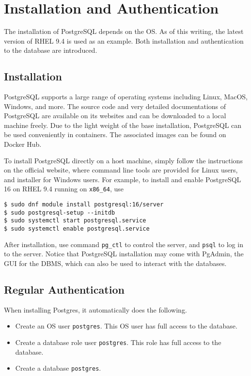 \section{Installation and Authentication}

The installation of PostgreSQL depends on the OS. As of this writing, the latest version of RHEL 9.4 is used as an example. Both installation and authentication to the database are introduced.

\subsection{Installation}

PostgreSQL supports a large range of operating systems including Linux, MacOS, Windows, and more. The source code and very detailed documentations of PostgreSQL are available on its websites and can be downloaded to a local machine freely. Due to the light weight of the base installation, PostgreSQL can be used conveniently in containers. The associated images can be found on Docker Hub.

To install PostgreSQL directly on a host machine, simply follow the instructions on the official website, where command line tools are provided for Linux users, and installer for Windows users. For example, to install and enable PostgreSQL 16 on RHEL 9.4 running on \verb|x86_64|, use
\begin{lstlisting}
$ sudo dnf module install postgresql:16/server
$ sudo postgresql-setup --initdb
$ sudo systemctl start postgresql.service
$ sudo systemctl enable postgresql.service
\end{lstlisting}

After installation, use command \verb|pg_ctl| to control the server, and \verb|psql| to log in to the server. Notice that PostgreSQL installation may come with PgAdmin, the GUI for the DBMS, which can also be used to interact with the databases.

\subsection{Regular Authentication}

When installing Postgres, it automatically does the following.
\begin{itemize}
  \item Create an OS user \texttt{postgres}. This OS user has full access to the database.
  \item Create a database role user \texttt{postgres}. This role has full access to the database.
  \item Create a database \texttt{postgres}.
\end{itemize}

